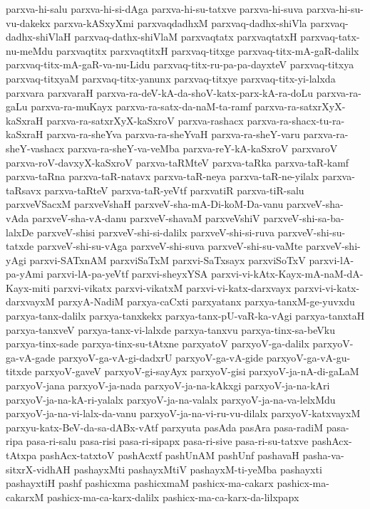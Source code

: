 {parxva-hi-salu
parxva-hi-si-dAga
parxva-hi-su-tatxve
parxva-hi-suva
parxva-hi-su-vu-dakekx
parxva-kASxyXmi
parxvaqdadhxM
parxvaq-dadhx-shiVla
parxvaq-dadhx-shiVlaH
parxvaq-dathx-shiVlaM
parxvaqtatx
parxvaqtatxH
parxvaq-tatx-nu-meMdu
parxvaqtitx
parxvaqtitxH
parxvaq-titxge
parxvaq-titx-mA-gaR-dalilx
parxvaq-titx-mA-gaR-va-nu-Lidu
parxvaq-titx-ru-pa-pa-dayxteV
parxvaq-titxya
parxvaq-titxyaM
parxvaq-titx-yanunx
parxvaq-titxye
parxvaq-titx-yi-lalxda
parxvara
parxvaraH
parxva-ra-deV-kA-da-shoV-katx-parx-kA-ra-doLu
parxva-ra-gaLu
parxva-ra-muKayx
parxva-ra-satx-da-naM-ta-ramf
parxva-ra-satxrXyX-kaSxraH
parxva-ra-satxrXyX-kaSxroV
parxva-rashacx
parxva-ra-shacx-tu-ra-kaSxraH
parxva-ra-sheYva
parxva-ra-sheYvaH
parxva-ra-sheY-varu
parxva-ra-sheY-vashacx
parxva-ra-sheY-va-veMba
parxva-reY-kA-kaSxroV
parxvaroV
parxva-roV-davxyX-kaSxroV
parxva-taRMteV
parxva-taRka
parxva-taR-kamf
parxva-taRna
parxva-taR-natavx
parxva-taR-neya
parxva-taR-ne-yilalx
parxva-taRsavx
parxva-taRteV
parxva-taR-yeVtf
parxvatiR
parxva-tiR-salu
parxveVSacxM
parxveVshaH
parxveV-sha-mA-Di-koM-Da-vanu
parxveV-sha-vAda
parxveV-sha-vA-danu
parxveV-shavaM
parxveVshiV
parxveV-shi-sa-ba-lalxDe
parxveV-shisi
parxveV-shi-si-dalilx
parxveV-shi-si-ruva
parxveV-shi-su-tatxde
parxveV-shi-su-vAga
parxveV-shi-suva
parxveV-shi-su-vaMte
parxveV-shi-yAgi
parxvi-SATxnAM
parxviSaTxM
parxvi-SaTxsayx
parxviSoTxV
parxvi-lA-pa-yAmi
parxvi-lA-pa-yeVtf
parxvi-sheyxYSA
parxvi-vi-kAtx-Kayx-mA-naM-dA-Kayx-miti
parxvi-vikatx
parxvi-vikatxM
parxvi-vi-katx-darxvayx
parxvi-vi-katx-darxvayxM
parxyA-NadiM
parxya-caCxti
parxyatanx
parxya-tanxM-ge-yuvxdu
parxya-tanx-dalilx
parxya-tanxkekx
parxya-tanx-pU-vaR-ka-vAgi
parxya-tanxtaH
parxya-tanxveV
parxya-tanx-vi-lalxde
parxya-tanxvu
parxya-tinx-sa-beVku
parxya-tinx-sade
parxya-tinx-su-tAtxne
parxyatoV
parxyoV-ga-dalilx
parxyoV-ga-vA-gade
parxyoV-ga-vA-gi-dadxrU
parxyoV-ga-vA-gide
parxyoV-ga-vA-gu-titxde
parxyoV-gaveV
parxyoV-gi-sayAyx
parxyoV-gisi
parxyoV-ja-nA-di-gaLaM
parxyoV-jana
parxyoV-ja-nada
parxyoV-ja-na-kAkxgi
parxyoV-ja-na-kAri
parxyoV-ja-na-kA-ri-yalalx
parxyoV-ja-na-valalx
parxyoV-ja-na-va-lelxMdu
parxyoV-ja-na-vi-lalx-da-vanu
parxyoV-ja-na-vi-ru-vu-dilalx
parxyoV-katxvayxM
parxyu-katx-BeV-da-sa-dABx-vAtf
parxyuta
pasAda
pasAra
pasa-radiM
pasa-ripa
pasa-ri-salu
pasa-risi
pasa-ri-sipapx
pasa-ri-sive
pasa-ri-su-tatxve
pashAcx-tAtxpa
pashAcx-tatxtoV
pashAcxtf
pashUnAM
pashUnf
pashavaH
pasha-va-sitxrX-vidhAH
pashayxMti
pashayxMtiV
pashayxM-ti-yeMba
pashayxti
pashayxtiH
pashf
pashicxma
pashicxmaM
pashicx-ma-cakarx
pashicx-ma-cakarxM
pashicx-ma-ca-karx-dalilx
pashicx-ma-ca-karx-da-lilxpapx
}
